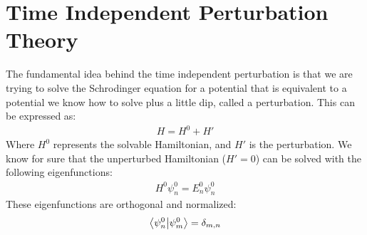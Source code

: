 \section{Time Independent Perturbation Theory}
The fundamental idea behind the time independent perturbation is that we are trying to solve the Schrodinger equation for a potential that is equivalent to a potential we know how to solve plus a little dip, called a perturbation. This can be expressed as:
\begin{align*}
H=H^0+H'
\end{align*}
Where $H^0$ represents the solvable Hamiltonian, and $H'$ is the perturbation. We know for sure that the unperturbed Hamiltonian ($H'=0$) can be solved with the following eigenfunctions:
\begin{align*}
  H^0\psi_n^0=E_n^0\psi_n^0
\end{align*}
These eigenfunctions are orthogonal and normalized:
\begin{align*}
  \ip{\psi_n^0}{\psi_m^0}=\delta_{m,n}
\end{align*}

